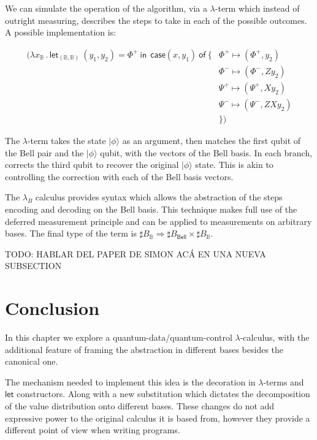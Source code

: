 \documentclass[runningheads,orivec]{llncs}
\newcommand\ket[1]{\ensuremath{|#1\rangle}}
\def\Pair#1#2{(#1,#2)} %
\def\Lam#1#2#3{\lambda#1_{#2}\,{.}\,#3} %
\def\letkeyword{\mathsf{let}}
\def\inkeyword{\mathsf{in}}
\def\LetP#1#2#3#4#5#6{\letkeyword_{\Pair{#2}{#4}}~\Pair{#1}{#3}=#5~\inkeyword~#6}
\def\Arr{\Rightarrow}
\newcommand\B{\mathbb B}
\newcommand{\Bell}{\mathsf{Bell}}
\newcommand{\lambdaB}{\lambda_B}
\newcommand\basis[1]{\ensuremath{B_{ #1 }}}
\begin{document}
We can simulate the operation of the algorithm, via a $\lambda$-term which instead of outright measuring, describes the steps to take in each of the possible outcomes. A possible implementation is:

\begin{align*}
    (\Lam{x}{\B}{\LetP{y_1}{\B}{y_2}{\B}{\Phi^+}{ ~\mathsf{case } \Pair{x}{y_1}  ~\mathsf{ of }~\{ &\Phi^+\mapsto \Pair{\Phi^+}{y_2}\\
    &\Phi^-\mapsto \Pair{\Phi^-}{Z y_2}\\
    &\Psi^+\mapsto \Pair{\Psi^+}{X y_2}\\
    &\Psi^-\mapsto \Pair{\Psi^-}{ZX y_2}\\
    &\}}})
\end{align*}

The $\lambda$-term takes the state $\ket{\phi}$ as an argument, then matches the first qubit of the Bell pair and the $\ket{\phi}$ qubit, with the vectors of the Bell basis. In each branch, corrects the third qubit to recover the original $\ket{\phi}$ state. This is akin to controlling the correction with each of the Bell basis vectors.

The $\lambdaB$ calculus provides syntax which allows the abstraction of the steps encoding and decoding on the Bell basis. This technique makes full use of the deferred measurement principle and can be applied to measurements on arbitrary bases. The final type of the term is $\sharp\basis{\B}\Arr \sharp\basis{\Bell}\times \sharp\basis{\B}$.

{\color{red} TODO: HABLAR DEL PAPER DE SIMON ACÁ EN UNA NUEVA SUBSECTION}

\section{Conclusion}\label{sec:conclusion}

In this chapter we explore a quantum-data/quantum-control $\lambda$-calculus, with the additional feature of framing the abstraction in different bases besides the canonical one.

The mechanism needed to implement this idea is the decoration in $\lambda$-terms and $\mathsf{let}$ constructors. Along with a new substitution which dictates the decomposition of the value distribution onto different bases. These changes do not add expressive power to the original calculus it is based from, however they provide a different point of view when writing programs. 
\end{document}
